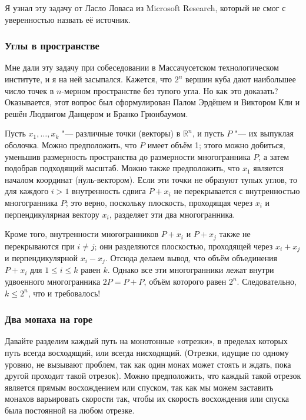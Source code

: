 \documentclass[twoside]{book}
\begin{document}
\medskip

Я узнал эту задачу от Ласло Ловаса из Microsoft Research, который не смог с уверенностью назвать её источник.

\subsubsection*{Углы в пространстве}

Мне дали эту задачу при собеседовании в Массачусетском технологическом институте, и я на ней засыпался.
Кажется, что $2^n$ вершин куба дают наибольшее число точек в $n$-мерном пространстве без тупого угла.
Но как это доказать?
Оказывается, этот вопрос был сформулирован Палом Эрдёшем и Виктором Кли и решён Людвигом Данцером и Бранко Грюнбаумом. %

\medskip

Пусть $x_1,\dots,x_k$ "--- различные точки (векторы) в $\mathbb{R}^n$, и пусть $P$ "--- их выпуклая оболочка.
Можно предположить, что $P$ имеет объём 1;
этого можно добиться, уменьшив размерность пространства до размерности многогранника $P$, а затем подобрав подходящий масштаб.
Можно также предположить, что $x_1$ является началом координат (нуль-вектором).
Если эти точки не образуют тупых углов, то для каждого $i>1$ внутренность сдвига $P+x_i$ не перекрывается с внутренностью многогранника $P$;
это верно, поскольку плоскость, проходящая через $x_i$ и перпендикулярная вектору $x_i$, разделяет эти два многогранника.

Кроме того, внутренности многогранников $P+x_i$ и $P+x_j$ также не перекрываются при $i\ne j$;
они разделяются плоскостью, проходящей через $x_i+x_j$ и перпендикулярной $x_i-x_j$.
Отсюда делаем вывод, что объём объединения $P+x_i$ для $1 \le i \le k$ равен $k$.
Однако все эти многогранники лежат внутри удвоенного многогранника $2P = P+P$, объём которого равен $2^n$. Следовательно, $k \le 2^n$, что и требовалось!
\heart



\subsubsection*{Два монаха на горе}

Давайте разделим каждый путь на монотонные «отрезки», в пределах которых путь всегда восходящий, или всегда нисходящий.
(Отрезки, идущие по одному уровню, не вызывают проблем, так как один монах может стоять и ждать, пока другой проходит такой отрезок).
Можно предположить, что каждый такой отрезок является прямым восхождением или спуском, так как мы можем заставить монахов варьировать скорости так, чтобы их скорость восхождения или спуска была постоянной на любом отрезке.
\end{document}
